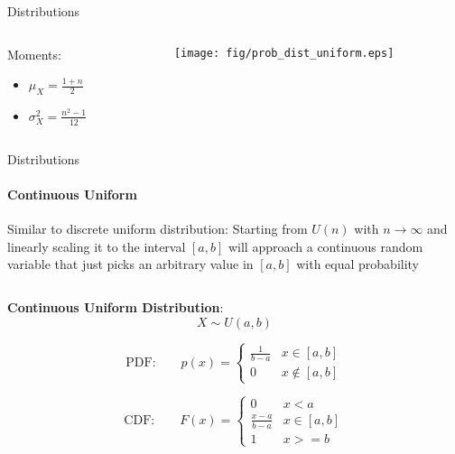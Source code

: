{\begin{frame}{Distributions}
\begin{columns}[onlytextwidth]
\begin{column}{0.5\textwidth}
\begin{boxed}
                    Moments:
                    \begin{itemize}
                        \item $\mu_X = \frac{1+n}{2}$
                        \item $\sigma_X^2 = \frac{n^2-1}{12}$
                    \end{itemize}
                \end{boxed}
            \end{column}
            \begin{column}{0.5\textwidth}
                \begin{center}
                    \texttt{[image: fig/prob\_dist\_uniform.eps]}
                \end{center}
            \end{column}
        \end{columns}
    \end{frame}

    \begin{frame}{Distributions}
        \framesubtitle{Continuous Uniform}
        \vspace*{-1mm}
        Similar to discrete uniform distribution: Starting from $U(n)$ with $n \rightarrow \infty$
        and linearly scaling it to the interval $[a,b]$ will approach a continuous random variable that just
        picks an arbitrary value in $[a,b]$ with equal probability

        \begin{columns}[onlytextwidth]
            \begin{column}{0.5\textwidth}
                \begin{boxed}
                    \textbf{Continuous Uniform Distribution}:
                    $$X \sim U(a, b)$$

                    $$\text{PDF:}\qquad p(x) = \begin{cases} \frac{1}{b-a} & x \in [a, b] \\ 0 & x \not\in [a, b]\end{cases}$$

                    $$\text{CDF:}\qquad F(x) = \begin{cases} 0 & x < a \\ \frac{x-a}{b-a} & x \in [a, b] \\ 1 & x >= b \end{cases}$$


\end{boxed}
\end{column}
\end{columns}
\end{frame}}
